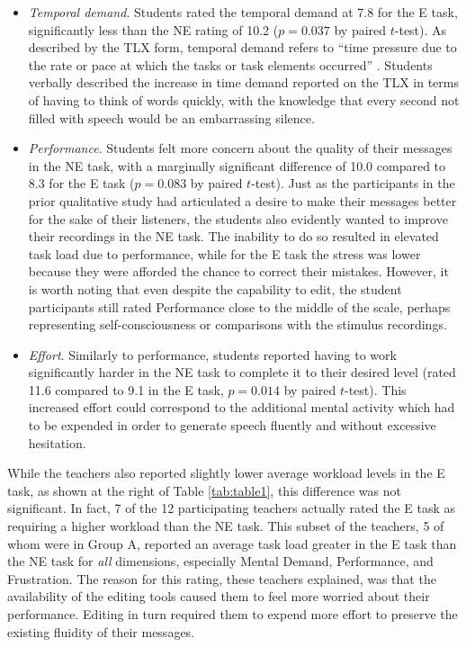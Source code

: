 \begin{itemize}
	\item \emph{Temporal demand}. Students rated the temporal demand at 7.8 for the E task, significantly less than the NE rating of 10.2 ($p=0.037$ by paired $t$-test). 
	As described by the TLX form, temporal demand refers to ``time pressure due to the rate or pace at which the tasks or task elements occurred'' \cite{nasatlx}.
	Students verbally described the increase in time demand reported on the TLX in terms of having to think of words quickly, with the knowledge that every second not filled with speech would be an embarrassing silence.
	\item \emph{Performance}. Students felt more concern about the quality of their messages in the NE task, with a marginally significant difference of 10.0 compared to 8.3 for the E task ($p=0.083$ by paired $t$-test). 
	Just as the participants in the prior qualitative study had articulated a desire to make their messages better for the sake of their listeners, the students also evidently wanted to improve their recordings in the NE task. 
	The inability to do so resulted in elevated task load due to performance, while for the E task the stress was lower because they were afforded the chance to correct their mistakes.
	However, it is worth noting that even despite the capability to edit, the student participants still rated Performance close to the middle of the scale, perhaps representing self-consciousness or comparisons with the stimulus recordings.
	\item \emph{Effort}. Similarly to performance, students reported having to work significantly harder in the NE task to complete it to their desired level (rated 11.6 compared to 9.1 in the E task, $p=0.014$ by paired $t$-test). 
	This increased effort could correspond to the additional mental activity which had to be expended in order to generate speech fluently and without excessive hesitation.
\end{itemize}

While the teachers also reported slightly lower average workload levels in the E task, as shown at the right of Table \ref{tab:table1}, this difference was not significant.
In fact, 7 of the 12 participating teachers actually rated the E task as requiring a higher workload than the NE task.
This subset of the teachers, 5 of whom were in Group A, reported an average task load greater in the E task than the NE task for \emph{all} dimensions, especially Mental Demand, Performance, and Frustration.
The reason for this rating, these teachers explained, was that the availability of the editing tools caused them to feel more worried about their performance.
Editing in turn required them to expend more effort to preserve the existing fluidity of their messages.

